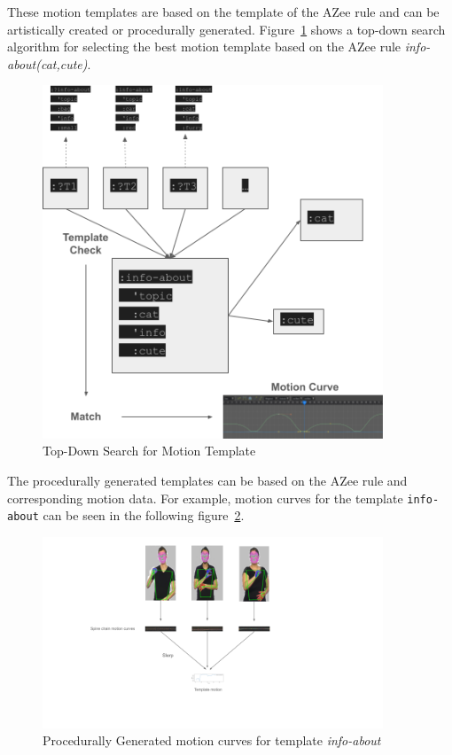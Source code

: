 \documentclass[../../main.tex]{subfiles}
\begin{document}
These motion templates are based on the template of the AZee rule and can be artistically created or procedurally generated. Figure~\ref{fig:top_down_search_template} shows a top-down search algorithm for selecting the best motion template based on the AZee rule \emph{info-about(cat,cute)}.

\begin{figure}
    \centering \includegraphics[width = 4in]{chapters/intermediate_blocks/images/top_down_search_template.png}
    \caption{Top-Down Search for Motion Template}
    \label{fig:top_down_search_template}
\end{figure}

The procedurally generated templates can be based on the AZee rule and corresponding motion data. For example, motion curves for the template \texttt{info-about} can be seen in the following figure~\ref{fig:motion_curves_template_procedural}.

\begin{figure}
    \centering \includegraphics[width = 4in]{chapters/intermediate_blocks/images/motion_curves_template_procedural.png}
    \caption{Procedurally Generated motion curves for template \emph{info-about}}
    \label{fig:motion_curves_template_procedural}
\end{figure}
\end{document}
